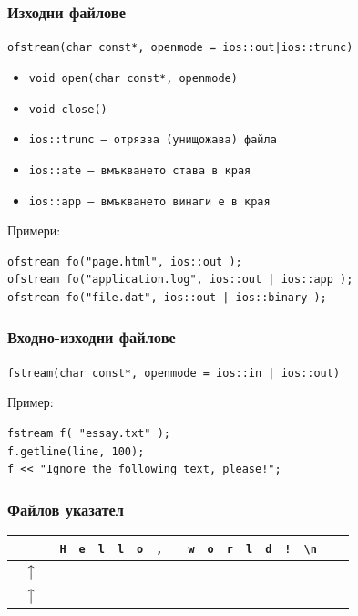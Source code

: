 \documentclass{beamer}
\begin{document}
\begin{frame}[fragile]
  \frametitle{Изходни файлове}

  \verb#ofstream(char const*, openmode = ios::out|ios::trunc)#
  \vspace{1em}

  \begin{itemize}
  \item \verb#void open(char const*, openmode)#
  \item \verb#void close()#
  \item \tt{ios::trunc} --- отрязва (унищожава) файла
  \item \tt{ios::ate} --- вмъкването става в края
  \item \tt{ios::app} --- вмъкването винаги е в края
  \end{itemize}
  \vspace{1em}

  Примери:
\begin{verbatim}
ofstream fo("page.html", ios::out );
ofstream fo("application.log", ios::out | ios::app );
ofstream fo("file.dat", ios::out | ios::binary );
\end{verbatim}

\end{frame}

\begin{frame}[fragile]
  \frametitle{Входно-изходни файлове}

  \verb#fstream(char const*, openmode = ios::in | ios::out)#
  \vspace{1em}
  
  Пример:
\begin{verbatim}
fstream f( "essay.txt" );
f.getline(line, 100);
f << "Ignore the following text, please!";
\end{verbatim}
\end{frame}

\begin{frame}[<1-2>]
  \frametitle{Файлов указател}
  \newcommand{\pta}{\phantom{\tt a}}

  \begin{tabular}{|c|c|c|c|c|c|c|c|c|c|c|c|c|c|c|c|c|c|c|}
    \rowcolor{blue!60!green!40}
    \hline
    \pta&\pta&\pta&\tt H&\tt e&\tt l&\tt l&\tt o&\tt ,&\pta&\tt w&\tt o&\tt r&\tt l&\tt d&\tt !&\tt{\textbackslash n}&\pta&\pta

    {\\\hline
    \rowcolor{white}
    \multicolumn{3}{c}{}&\multicolumn{1}{c}{$\big\uparrow\!$}&\multicolumn{15}{c}{}}
    {\\\hline
    \rowcolor{white}
    \multicolumn{9}{c}{}&\multicolumn{1}{c}{$\big\uparrow\!$}&\multicolumn{9}{c}{}}
  \end{tabular}
  \pause

\end{frame}
\end{document}
